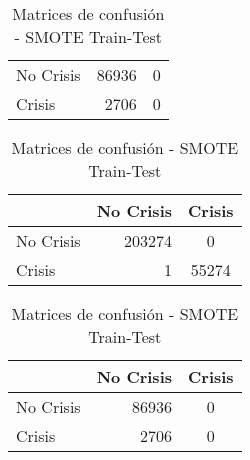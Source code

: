 \begin{table}
\begin{center}
\begin{subtable}[c]{0.4\textwidth}
\begin{tabular}{lrc}
                \hline
                No Crisis & 86936 & 0 \\
                Crisis & 2706 & 0\\
                \hline
            \end{tabular}
            \label{tab:mat-conf-ada-test}
        \end{subtable}
        \begin{subtable}[c]{0.4\textwidth}
            \begin{tabular}{lrc}
                \hline
                 & No Crisis & Crisis \\
                \hline
                No Crisis & 203274  & 0 \\
                Crisis & 1 & 55274\\
                \hline
            \end{tabular}
            \label{tab:mat-conf-rotfor-train}
        \end{subtable}
        \hspace{1em}\vspace{1em}
        \begin{subtable}[c]{0.4\textwidth}
            \begin{tabular}{lrc}
                \hline
                 & No Crisis & Crisis \\
                \hline
                No Crisis &  86936 & 0 \\
                Crisis & 2706 & 0\\
                \hline
            \end{tabular}
            \label{tab:mat-conf-rotfor-test}
        \end{subtable}
    \caption{Matrices de confusión - SMOTE Train-Test}
    \label{tab:matriz-smote-2-3a}
    \end{center}
\end{table}
